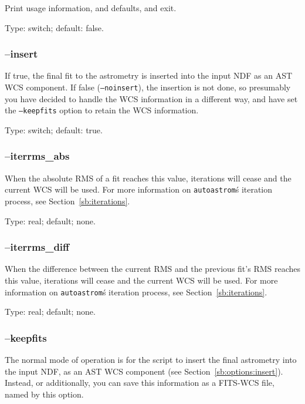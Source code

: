 \documentclass[twoside,11pt]{article}
\newcommand{\xlabel}[1]{}
\newcommand{\autoastrom}{\texttt{autoastrom}}
\begin{document}
Print usage information, and defaults, and exit.

Type: switch; default: false.

\subsubsection{\xlabel{sb_options_insert}--insert\label{sb:options:insert}}

If true, the final fit to the astrometry is inserted into the input NDF as an
AST WCS component.  If false (\texttt{--noinsert}), the insertion is not done,
so presumably you have decided to handle the WCS information in a different
way, and have set the \texttt{--keepfits} option to retain the WCS
information.

Type: switch; default: true.

\subsubsection{\xlabel{sb_options_iterrms_abs}--iterrms\_abs\label{sb:options:iterrms_abs}}

When the absolute RMS of a fit reaches this value, iterations will cease and
the current WCS will be used. For more information on \autoastrom\'s iteration
process, see Section~\ref{sb:iterations}.

Type: real; default; none.

\subsubsection{\xlabel{sb_options_iterrms_diff}--iterrms\_diff\label{sb:options:iterrms_diff}}

When the difference between the current RMS and the previous fit's RMS reaches
this value, iterations will cease and the current WCS will be used. For more
information on \autoastrom\'s iteration process, see
Section~\ref{sb:iterations}.

Type: real; default; none.

\subsubsection{\xlabel{sb_options_keepfits}--keepfits\label{sb:options:keepfits}}

The normal mode of operation is for the script to insert the final astrometry
into the input NDF, as an AST WCS component (see
Section~\ref{sb:options:insert}).  Instead, or additionally, you can save this
information as a FITS-WCS file, named by this option.
\end{document}
